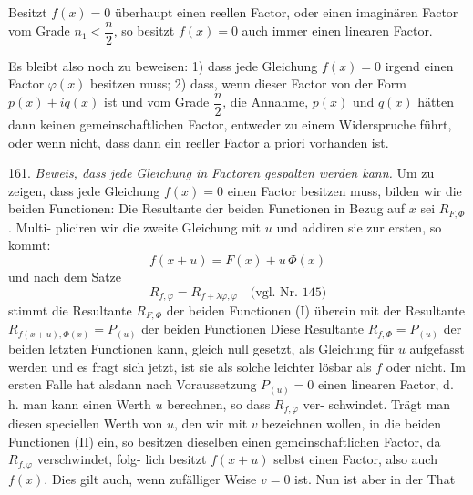 \glqq Besitzt $f(x)=0$ überhaupt einen reellen Factor, oder einen
imaginären Factor vom Grade $n_1<\dfrac{n}{2}$, so besitzt $f(x)=0$
auch immer einen linearen Factor.\grqq{}

Es bleibt also noch zu beweisen: 1) dass jede Gleichung $f(x)=0$
irgend einen Factor $\varphi(x)$ besitzen muss; 2) dass, wenn dieser Factor
von der Form $p(x)+iq(x)$ ist und vom Grade $\dfrac{n}{2}$, die Annahme, $p(x)$
und $q(x)$ hätten dann keinen gemeinschaftlichen Factor, entweder zu
einem Widerspruche führt, oder wenn nicht, dass dann ein reeller
Factor a priori vorhanden ist.

161. \emph{Beweis, dass jede Gleichung in Factoren gespalten werden kann.}
Um zu zeigen, dass jede Gleichung $f(x)=0$ einen Factor besitzen
muss, bilden wir die beiden Functionen:
Die Resultante der beiden Functionen in Bezug auf $x$ sei $R_{F,\Phi}$. Multi-
pliciren wir die zweite Gleichung mit $u$ und addiren sie zur ersten,
so kommt:
\[ f(x+u) = F(x) + u\,\Phi(x) \]
und nach dem Satze
\[ R_{f,\varphi} = R_{f+\lambda\varphi,\varphi} \quad \text{(vgl. Nr. 145)} \]
stimmt die Resultante $R_{F,\Phi}$ der beiden Functionen (I) überein mit der
Resultante $R_{f(x+u),\Phi(x)} = P_{(u)}$ der beiden Functionen
Diese Resultante $R_{f,\Phi} = P_{(u)}$ der beiden letzten Functionen kann,
gleich null gesetzt, als Gleichung für $u$ aufgefasst werden und es
fragt sich jetzt, ist sie als solche leichter lösbar als $f$ oder nicht.
Im ersten Falle hat alsdann nach Voraussetzung $P_{(u)}=0$ einen linearen
Factor, d. h. man kann einen Werth $u$ berechnen, so dass $R_{f,\varphi}$ ver-
schwindet. Trägt man diesen speciellen Werth von $u$, den wir mit
$v$ bezeichnen wollen, in die beiden Functionen (II) ein, so besitzen
dieselben einen gemeinschaftlichen Factor, da $R_{f,\varphi}$ verschwindet, folg-
lich besitzt $f(x+u)$ selbst einen Factor, also auch $f(x)$. Dies gilt
auch, wenn zufälliger Weise $v=0$ ist. Nun ist aber in der That




